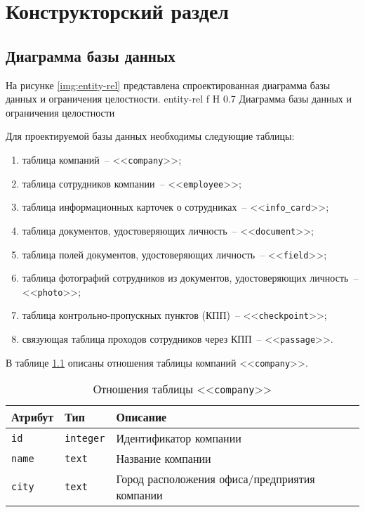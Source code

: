 \chapter{Конструкторский раздел}
	
\section{Диаграмма базы данных}

На рисунке \ref{img:entity-rel} представлена спроектированная диаграмма базы данных и ограничения целостности.
	{entity-rel}
	{f}
	{H}
	{0.7\textwidth}
	{Диаграмма базы данных и ограничения целостности}
	
\clearpage

Для проектируемой базы данных необходимы следующие таблицы:
\begin{enumerate}
	\item таблица компаний~-- <<\texttt{company}>>;
	\item таблица сотрудников компании~-- <<\texttt{employee}>>;
	\item таблица информационных карточек о сотрудниках~-- <<\texttt{info\_card}>>;
	\item таблица документов, удостоверяющих личность~-- <<\texttt{document}>>;
	\item таблица полей документов, удостоверяющих личность~-- <<\texttt{field}>>;
	\item таблица фотографий сотрудников из документов, удостоверяющих личность~-- <<\texttt{photo}>>;
	\item таблица контрольно-пропускных пунктов (КПП)~-- <<\texttt{checkpoint}>>;
	\item связующая таблица проходов сотрудников через КПП~-- <<\texttt{passage}>>.
\end{enumerate}

В таблице \ref{table:companyCols} описаны отношения таблицы компаний <<\texttt{company}>>.
\begin{table}[h!]
	\begin{center}
		\caption{\label{table:companyCols} Отношения таблицы <<\texttt{company}>>}
		\begin{tabularx}{\textwidth}{|X|X|X|}
			\hline
			Атрибут & Тип & Описание \\ \hline
			\texttt{id} & \texttt{integer} & Идентификатор компании \\ \hline
			\texttt{name} & \texttt{text} & Название компании \\ \hline
			\texttt{city} & \texttt{text} & Город расположения офиса/предприятия компании \\ \hline
		\end{tabularx}
	\end{center}
\end{table}


